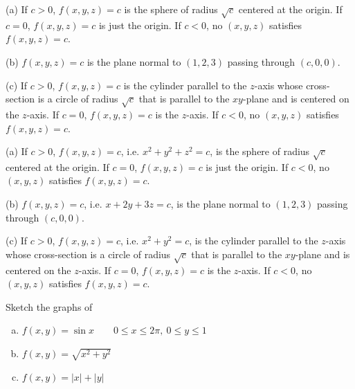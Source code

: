 %

\begin{answer}
(a)
 If $c>0$, $f(x,y,z)=c$
is the sphere of radius $\sqrt{c}$ centered at the origin. 
If $c=0$, $f(x,y,z)=c$ is just the origin. If $c<0$, no
$(x,y,z)$ satisfies $f(x,y,z)=c$.

(b) $f(x,y,z)=c$ is the plane normal to 
$(1,2,3)$ passing through $(c,0,0)$.

(c) If $c>0$, $f(x,y,z)=c$ is the cylinder 
parallel to the $z$-axis whose cross-section is a circle of 
radius $\sqrt{c}$ that is parallel to the $xy$-plane and is centered on the
$z$-axis. 
If $c=0$, $f(x,y,z)=c$ is the $z$-axis. If $c<0$, no
$(x,y,z)$ satisfies $f(x,y,z)=c$. 

\end{answer}

\begin{solution} (a)
 If $c>0$, $f(x,y,z)=c$, i.e. $x^2+y^2+z^2=c$, 
is the sphere of radius $\sqrt{c}$ centered at the origin. 
If $c=0$, $f(x,y,z)=c$ is just the origin. If $c<0$, no
$(x,y,z)$ satisfies $f(x,y,z)=c$. 

(b)  $f(x,y,z)=c$, i.e. $x+2y+3z=c$, is the plane normal to 
$(1,2,3)$ passing through $(c,0,0)$. 

(c) If $c>0$, $f(x,y,z)=c$, i.e. $x^2+y^2=c$, is the cylinder 
parallel to the $z$-axis whose cross-section is a circle of 
radius $\sqrt{c}$ that is parallel to the $xy$-plane and is centered on the
$z$-axis. 
If $c=0$, $f(x,y,z)=c$ is the $z$-axis. If $c<0$, no
$(x,y,z)$ satisfies $f(x,y,z)=c$. 

\end{solution}

\begin{question}
Sketch the graphs of
\begin{enumerate}[(a)]
\item $f(x,y)=\sin x\qquad 0\le x\le 2\pi,\ 0\le y\le 1$
\item $f(x,y)=\sqrt{x^2+y^2}$
\item $f(x,y)=|x|+|y|$
\end{enumerate}

\end{question}

%

